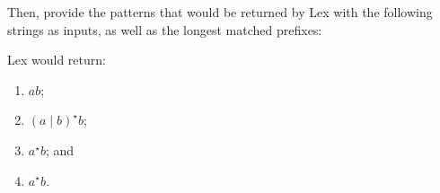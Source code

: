 Then, provide the patterns that would be returned by Lex
with the following strings as inputs, as well as the longest
matched prefixes:
\begin{solution}
    Lex would return:
    \begin{enumerate}
        \item $ab$;
        \item $(a \mid b)^\star b$;
        \item $a^\star b$; and
        \item $a^\star b$.
    \end{enumerate}
\end{solution}
